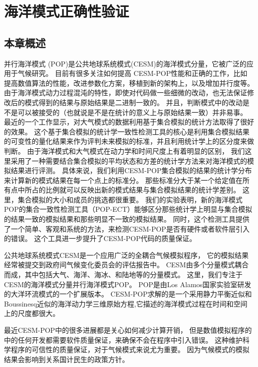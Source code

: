 \chapter{海洋模式正确性验证}
\label{cha:verify}

\section{本章概述}
并行海洋模式 (POP)是公共地球系统模式(CESM)的海洋模式分量，它被广泛的应用于气候研究。 
目前有很多关注如何提高  CESM-POP性能和正确的工作，比如提高数值算法的性能，改进参数化方案，移植到新的架构上，以及增加并行度等。 
由于海洋模式动力过程混沌的特性，即使对代码做一些细微的改动，也无法保证修改后的模式得到的结果与原始结果是二进制一致的。 
并且，判断模式中的改动是不是可以被接受的（也就说是不是在统计的意义上与原始结果一致）并非易事。 
最近的一个工作显示，对大气模式的数据利用基于集合模拟的统计方法取得了很好的效果。
这个基于集合模拟的统计学一致性检测工具的核心是利用集合模拟结果的可变性的量化结果来作为评判未来模拟的标准，并且利用统计学上的区分度来做判断。 
由于海洋模式和大气模式在动力学和时间尺度上有着明显的区别， 我们这里采用了一种需要结合集合模拟的平均状态和方差的统计学方法来对海洋模式的模拟结果进行评测。 
具体来说，我们利用CESM-POP集合模拟的结果的统计学分布来计算新的模式结果在每一个点上的标准分。 
那些标准分大于某一个给定值在所有点中所占的比例就可以反映出新的模式结果与集合模拟结果的统计学差别。 
这里，集合模拟的大小和成员的挑选都很重要。
我们的实验表明，新的海洋模式POP的集合一致性检测工具（POP-ECT）能够区分那些统计学上明显与集合模拟的结果一致的模拟结果和那些明显不一致的模拟结果。 
同时，这个检测工具提供了一个简单、客观和系统的方法，来检测CESM-POP是否有硬件或者软件层引入的错误。
这个工具进一步提升了CESM-POP代码的质量保证。 

公共地球系统模式CESM是一个应用广泛的全耦合气候模拟程序\citep{cesm2013}， 它的模拟结果经常被提交到政府间气候变化委员会的评估报告中\cite{stocker2013ipcc}。
CESM由多个分量模式耦合而成，其中包括大气、海洋、海冰、和陆地等的分量模式。 
这里，我们专注于CESM的海洋模式分量并行海洋模式POP。 POP是由Los Alamos国家实验室研发的大洋环流模式的一个扩展版本。 
CESM-POP求解的是一个采用静力平衡近似和Boussinesq近似的海洋动力学三维原始方程,它描述的海洋模式过程在时间和空间上的尺度都很大。  

 
 
最近CESM-POP中的很多进展都是关心如何减少计算开销\citep{yong2015}， 但是数值模拟程序的中的任何开发都需要软件质量保证，来确保不会在程序中引入错误。 
这种维护科学程序的可信性的质量保证，对于气候模式来说尤为重要。 
因为气候模式的模拟结果会影响到关系国计民生的政策方针\citep{carson2002, easterbrook2011}。 

